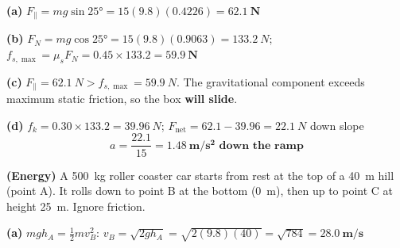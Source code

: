 \documentclass[addpoints]{exam}
\begin{document}
\begin{questions}
\begin{solution}[9cm]
\textbf{(a)} $F_\parallel = mg\sin\ang{25} = 15(9.8)(0.4226) = \mathbf{\SI{62.1}{N}}$

\textbf{(b)} $F_N = mg\cos\ang{25} = 15(9.8)(0.9063) = \SI{133.2}{N}$;\quad
$f_{s,\max} = \mu_s F_N = 0.45 \times 133.2 = \mathbf{\SI{59.9}{N}}$

\textbf{(c)} $F_\parallel = \SI{62.1}{N} > f_{s,\max} = \SI{59.9}{N}$. The gravitational
component exceeds maximum static friction, so the box \textbf{will slide}.

\textbf{(d)} $f_k = 0.30 \times 133.2 = \SI{39.96}{N}$;\quad
$F_\text{net} = 62.1 - 39.96 = \SI{22.1}{N}$ down slope
\[
a = \frac{22.1}{15} = \mathbf{\SI{1.48}{m/s^2} \text{ down the ramp}}
\]
\end{solution}

\question \textbf{(Energy)} A \SI{500}{kg} roller coaster car starts from rest at the
top of a \SI{40}{m} hill (point A). It rolls down to point B at the bottom
(\SI{0}{m}), then up to point C at height \SI{25}{m}.
Ignore friction.
\begin{solution}[9cm]
\textbf{(a)} $mgh_A = \tfrac{1}{2}mv_B^2$:\quad
$v_B = \sqrt{2gh_A} = \sqrt{2(9.8)(40)} = \sqrt{784} = \mathbf{\SI{28.0}{m/s}}$


\end{solution}
\end{questions}
\end{document}
